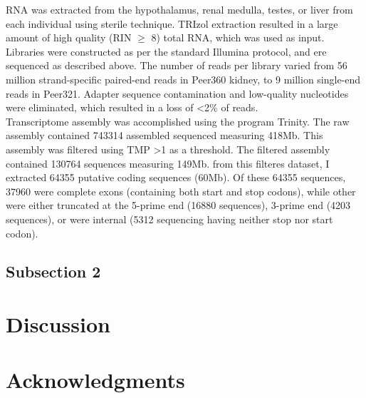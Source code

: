 \documentclass[11pt]{article}
\begin{document}
RNA was extracted from the hypothalamus, renal medulla, testes, or liver from each individual using sterile technique. TRIzol extraction resulted in a large amount of high quality (RIN $\geq$ 8) total RNA, which was used as input. Libraries were constructed as per the standard Illumina protocol, and ere sequenced as described above. The number of reads per library varied from 56 million strand-specific paired-end reads in Peer360 kidney, to 9 million single-end reads in Peer321. Adapter sequence contamination and low-quality nucleotides were eliminated, which resulted in a loss of \textless 2\% of reads. \\

Transcriptome assembly was accomplished using the program Trinity. The raw assembly contained 743314 assembled sequenced measuring 418Mb. This assembly was filtered using TMP \textgreater 1 as a threshold. The filtered assembly contained 130764 sequences measuring 149Mb. from this filteres dataset, I extracted 64355 putative coding sequences (60Mb). Of these 64355 sequences, 37960 were complete exons (containing both start and stop codons), while other were either truncated at the 5-prime end (16880 sequences), 3-prime end (4203 sequences), or were internal (5312 sequencing having neither stop nor start codon). 



\subsection*{Subsection 2}

\section*{Discussion}


\section*{Acknowledgments}



\end{document}
